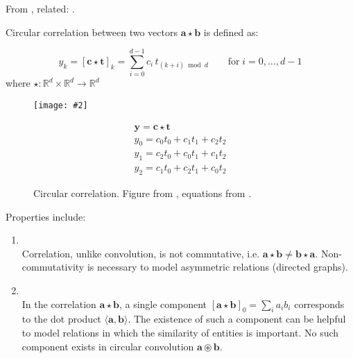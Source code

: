 \documentclass{article}
\makeatletter
\DeclareRobustCommand{\ie}{i.e.\@\xspace}
\newcommand{\gph}[2]{\texttt{[image: \#2]}}
\makeatother
\begin{document}
From \cite{nickel2016holographic,plate1995holographic}, related: \cite{tay2017learning}.

Circular correlation between two vectors $\mathbf{a} \star \mathbf{b}$ is defined as:

\begin{equation}
    y_k = \left[\mathbf{c} \star \mathbf{t}\right]_{k} = \sum_{i=0}^{d-1} c_{i} \, t_{(k+i) \bmod d} \qquad \text{for} \; i = 0, \dotsc, d-1
\end{equation}
\noindent
where $\star : \mathbb{R}^{d} \times \mathbb{R}^{d} \rightarrow \mathbb{R}^{d}$

\begin{figure}[h]
\begin{minipage}{0.5\linewidth}
    \begin{center}
    \gph{0.5}{images/circular_correlation.png}
    \end{center}
\end{minipage}
\begin{minipage}{0.5\linewidth}
    \begin{equation}
        \begin{array}{c}{\mathbf{y} = \mathbf{c} \star \mathbf{t}} \\ {y_{0}=c_{0} t_{0}+c_{1} t_{1}+c_{2} t_{2}} \\ {y_{1}=c_{2} t_{0}+c_{0} t_{1}+c_{1} t_{2}} \\ {y_{2}=c_{1} t_{0}+c_{2} t_{1}+c_{0} t_{2}}\end{array}
    \end{equation}
\end{minipage}
\caption{Circular correlation. Figure from \cite{plate1995holographic}, equations from \cite{plate1995holographic,nickel2016holographic}.}
\end{figure}

Properties include:

\begin{enumerate}[label=\roman*)]
    \item { \\
            Correlation, unlike convolution, is not commutative, \ie{} $\mathbf{a} \star \mathbf{b} \neq \mathbf{b} \star \mathbf{a}$. Non-commutativity is necessary to model asymmetric relations (directed graphs).}
    \item { \\
            In the correlation $\mathbf{a} \star \mathbf{b}$, a single component $[\mathbf{a} \star \mathbf{b}]_{0}=\sum_{i} a_{i} b_{i}$ corresponds to the dot product $\langle\mathbf{a}, \mathbf{b}\rangle$. The existence of such a component can be helpful to model relations in which the similarity of entities is important. No such component exists in circular convolution $\mathbf{a} \circledast \mathbf{b}$.}
\end{enumerate}
\end{document}
